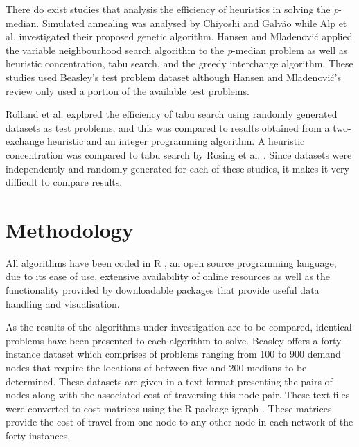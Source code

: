 \documentclass[11pt]{article}
\begin{document}
	There do exist studies that analysis the efficiency of heuristics in solving the \emph{p}-median.  Simulated annealing was analysed by Chiyoshi  and Galv\~{a}o  \cite{CHIY00} while Alp et al. \cite{ALPO03} investigated their proposed genetic algorithm.  Hansen and Mladenovi\'{c} \cite{HANS01} applied the variable neighbourhood search algorithm to the \emph{p}-median problem as well as heuristic concentration, tabu search, and the greedy interchange algorithm.  These studies used Beasley's test problem dataset although Hansen  and Mladenovi\'{c}'s review only used a portion of the available test problems.  
	
	Rolland et al. \cite{ROLL97} explored the efficiency of tabu search using randomly generated datasets as test problems, and this was compared to results obtained from a two-exchange heuristic and an integer programming algorithm.  A heuristic concentration was compared to tabu search by Rosing et al. \cite{ROSI98}.  Since datasets were independently and randomly generated for each of these studies, it makes it very difficult to compare results.
	
	
	\section{Methodology} \label{methodology}
	All algorithms have been coded in R \cite{RPROGRAMME}, an open source programming language, due to its ease of use, extensive availability of online resources as well as the functionality provided by downloadable packages that provide useful data handling and visualisation.
	
	As the results of the algorithms under investigation are to be compared, identical problems have been presented to each algorithm to solve.  Beasley \cite{BEAS90}  offers a forty-instance dataset which comprises of problems ranging from 100 to 900 demand nodes that require the locations of between five and 200 medians to be determined.  These datasets are given in a text format presenting the pairs of nodes along with the associated cost of traversing this node pair.  These text files were converted to cost matrices using the R package igraph \cite{RIGRAPH}.  These matrices provide the cost of travel from one node to any other node in each network of the forty instances.
	
\end{document}
